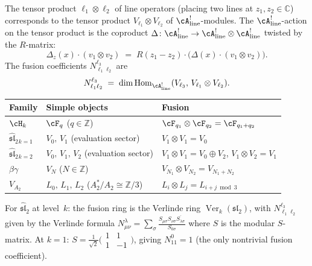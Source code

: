 \begin{construction}
\label{constr:fusion-from-bar}
The tensor product $\ell_1\otimes\ell_2$ of line operators
(placing two lines at $z_1,z_2\in\mathbb C$) corresponds to
the tensor product $V_{\ell_1}\otimes V_{\ell_2}$ of
$\cA^!_{\mathrm{line}}$-modules. The
$\cA^!_{\mathrm{line}}$-action on the tensor product
is the coproduct
$\Delta\colon\cA^!_{\mathrm{line}}\to
\cA^!_{\mathrm{line}}\otimes\cA^!_{\mathrm{line}}$
twisted by the $R$-matrix:
\[
\Delta_z(x)\cdot(v_1\otimes v_2)
\;=\;
R(z_1{-}z_2)\cdot
\bigl(\Delta(x)\cdot(v_1\otimes v_2)\bigr).
\]
The fusion coefficients $N^{\ell_3}_{\ell_1\ell_2}$ are
\[
N^{\ell_3}_{\ell_1\ell_2}
\;=\;
\dim\operatorname{Hom}_{\cA^!_{\mathrm{line}}}(V_{\ell_3},\,
V_{\ell_1}\otimes V_{\ell_2}).
\]
\end{construction}

\begin{computation}
\label{comp:fusion-standard}
\begin{center}
\renewcommand{\arraystretch}{1.2}
\begin{tabular}{lll}
\textbf{Family} & \textbf{Simple objects}
 & \textbf{Fusion} \\
\hline
$\cH_k$ & $\cF_q$ ($q\in\mathbb Z$)
 & $\cF_{q_1}\otimes\cF_{q_2}=\cF_{q_1+q_2}$ \\[3pt]
$\widehat{\mathfrak{sl}}_2{}_{k=1}$
 & $V_0,\,V_1$ (evaluation sector)
 & $V_1\otimes V_1=V_0$ \\[3pt]
$\widehat{\mathfrak{sl}}_2{}_{k=2}$
 & $V_0,\,V_1,\,V_2$ (evaluation sector)
 & $V_1\otimes V_1=V_0\oplus V_2$,\;
 $V_1\otimes V_2=V_1$ \\[3pt]
$\beta\gamma$
 & $V_N$ ($N\in\mathbb Z$)
 & $V_{N_1}\otimes V_{N_2}=V_{N_1+N_2}$ \\[3pt]
$V_{A_2}$
 & $L_0,\,L_1,\,L_2$ ($A_2^*/A_2\cong\mathbb Z/3$)
 & $L_i\otimes L_j=L_{i+j\bmod 3}$
\end{tabular}
\end{center}
For $\widehat{\mathfrak{sl}}_2$ at level~$k$: the fusion ring
is the Verlinde ring $\operatorname{Ver}_k(\mathfrak{sl}_2)$,
with $N^{\ell_3}_{\ell_1\ell_2}$ given by the
Verlinde formula
$N^\lambda_{\mu\nu}
=\sum_\sigma\frac{S_{\mu\sigma}S_{\nu\sigma}
\overline{S_{\lambda\sigma}}}{S_{0\sigma}}$
where $S$ is the modular $S$-matrix.
At $k=1$: $S=\frac{1}{\sqrt2}
\bigl(\begin{smallmatrix}1&1\\1&-1\end{smallmatrix}\bigr)$,
giving $N^0_{11}=1$ (the only nontrivial fusion coefficient).
\end{computation}

